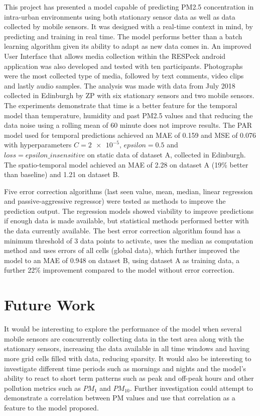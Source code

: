 This project has presented a model capable of predicting PM2.5 concentration in intra-urban environments using both stationary sensor data as well as data collected by mobile sensors. It was designed with a real-time context in mind, by predicting and training in real time. The model performs better than a batch learning algorithm given its ability to adapt as new data comes in.  An improved User Interface that allows media collection within the RESPeck android application was also developed and tested with ten participants. Photographs were the most collected type of media, followed by text comments, video clips and lastly audio samples.
The analysis was made with data from July 2018 collected in Edinburgh by ZP with six stationary sensors and two mobile sensors. The experiments demonstrate that time is a better feature for the temporal model than temperature, humidity and past PM2.5 values and that reducing the data noise using a rolling mean of 60 minute does not improve results. The PAR model used for temporal predictions achieved an MAE of 0.159 and MSE of 0.076 with hyperparameters $C= \num{2e-5}$, $epsilon = 0.5$ and $loss = epsilon\_insensitive$ on static data of dataset A, collected in Edinburgh. The spatio-temporal model achieved an MAE of 2.28 on dataset A (19\% better than baseline) and 1.21 on dataset B. 

Five error correction algorithms (last seen value, mean, median, linear regression and passive-aggressive regressor) were tested as methods to improve the prediction output. The regression models showed viability to improve predictions if enough data is made available, but statistical methods performed better with the data currently available. The best error correction algorithm found has a minimum threshold of 3 data points to activate, uses the median as computation method and uses errors of all cells (global data), which further improved the model to an MAE of 0.948 on dataset B, using dataset A as training data, a further 22\% improvement compared to the model without error correction.


\section{Future Work}

It would be interesting to explore the performance of the model when several mobile sensors are concurrently collecting data in the test area along with the stationary sensors, increasing the data available in all time windows and having more grid cells filled with data, reducing sparsity. It would also be interesting to investigate different time periods such as mornings and nights and the model's ability to react to short term patterns such as peak and off-peak hours and other pollution metrics such as $PM_1$ and $PM_{10}$. Further investigation could attempt to demonstrate a correlation between PM values and use that correlation as a feature to the model proposed.

